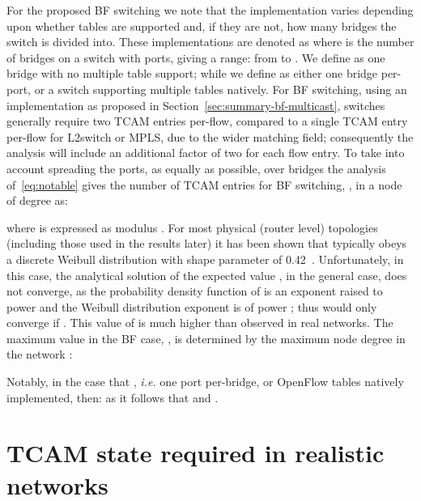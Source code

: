 \documentclass[conference]{IEEEtran}
\newcommand{\ie}{\emph{i.e.}\xspace}
\begin{document}
For the proposed BF switching we note that the implementation varies depending upon whether tables are supported and, if they are not, how many bridges the switch is divided into. These implementations are denoted as  where  is the number of bridges on a switch with  ports, giving a range: from  to .  We define  as one bridge with no multiple table support; while we define  as either one bridge per-port, or a switch supporting multiple tables natively. For BF switching, using an implementation as proposed in Section~\ref{sec:summary-bf-multicast}, switches generally require two TCAM entries per-flow, compared to a single TCAM entry per-flow for L2switch or MPLS, due to the wider matching field; consequently the analysis will include an additional factor of two for each flow entry. To take into account spreading the ports, as equally as possible, over  bridges the analysis of~\eqref{eq:notable} gives the number of TCAM entries for BF switching, , in a node of degree  as:

where  is  expressed as modulus . For most physical (router level) topologies (including those used in the results later) it
has been shown that  typically obeys a discrete Weibull
distribution with shape parameter of 0.42~\cite{Spring02}. Unfortunately, in this case, the analytical solution of the expected value  , in the general case, does not converge, as the probability density function of  is an exponent raised to power  and the Weibull distribution exponent is of power ; thus  would only converge if . This value of  is much higher than observed in real networks.
The maximum value in the BF case, , is determined by the maximum node degree in the network :

Notably,  in the case that , \ie one port per-bridge, or OpenFlow tables natively implemented, then: as  it follows that  and .

\section{TCAM state required in realistic networks}
\label{sec:results}
\end{document}
